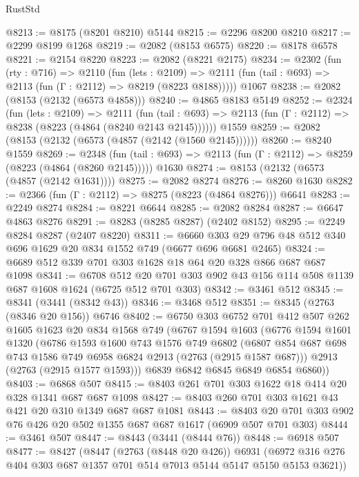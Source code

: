 \begin{lexlean}{RustStd}
\begin{coremodule}
@8213 := @8175 (@8201 @8210) @5144
@8215 := @2296 @8200 @8210
@8217 := @2299 @8199 @1268
@8219 := @2082 (@8153 @6575)
@8220 := @8178 @6578
@8221 := @2154 @8220
@8223 := @2082 (@8221 @2175)
@8234 := @2302
    (fun (rty : @716) =>
    @2110
      (fun (lets : @2109) =>
      @2111 (fun (tail : @693) => @2113 (fun (Γ : @2112) => @8219 (@8223 @8188)))))
    @1067
@8238 := @2082 (@8153 (@2132 (@6573 @4858)))
@8240 := @4865 @8183 @5149
@8252 := @2324
    (fun (lets : @2109) =>
    @2111
      (fun (tail : @693) => @2113 (fun (Γ : @2112) => @8238 (@8223 (@4864 (@8240 @2143 @2145))))))
    @1559
@8259 := @2082 (@8153 (@2132 (@6573 (@4857 (@2142 (@1560 @2145))))))
@8260 := @8240 @1559
@8269 := @2348
    (fun (tail : @693) => @2113 (fun (Γ : @2112) => @8259 (@8223 (@4864 (@8260 @2145)))))
    @1630
@8274 := @8153 (@2132 (@6573 (@4857 (@2142 @1631))))
@8275 := @2082 @8274
@8276 := @8260 @1630
@8282 := @2366 (fun (Γ : @2112) => @8275 (@8223 (@4864 @8276))) @6641
@8283 := @2249 @8274
@8284 := @8221 @6644
@8285 := @2082 @8284
@8287 := @6647 @4863 @8276
@8291 := @8283 (@8285 @8287) (@2402 @8152)
@8295 := @2249 @8284 @8287 (@2407 @8220)
@8311 := @6660 @303 @29 @796 @48 @512 @340 @696 @1629 @20 @834 @1552 @749 (@6677 @696 @6681 @2465)
@8324 := @6689 @512 @339 @701 @303 @1628 @18 @64 @20 @328 @866 @687 @687 @1098
@8341 := @6708
    @512
    @20
    @701
    @303
    @902
    @43
    @156
    @114
    @508
    @1139
    @687
    @1608
    @1624
    (@6725 @512 @701 @303)
@8342 := @3461 @512
@8345 := @8341 (@3441 (@8342 @43))
@8346 := @3468 @512
@8351 := @8345 (@2763 (@8346 @20 @156)) @6746
@8402 := @6750
    @303
    @6752
    @701
    @412
    @507
    @262
    @1605
    @1623
    @20
    @834
    @1568
    @749
    (@6767
      @1594
      @1603
      (@6776
        @1594
        @1601
        @1320
        (@6786
          @1593
          @1600
          @743
          @1576
          @749
          @6802
          (@6807 @854 @687 @698 @743 @1586 @749 @6958 @6824 @2913 (@2763 (@2915 @1587 @687)))
          @2913
          (@2763 (@2915 @1577 @1593)))
        @6839
        @6842
        @6845
        @6849
        @6854
        @6860))
@8403 := @6868 @507
@8415 := @8403 @261 @701 @303 @1622 @18 @414 @20 @328 @1341 @687 @687 @1098
@8427 := @8403 @260 @701 @303 @1621 @43 @421 @20 @310 @1349 @687 @687 @1081
@8443 := @8403 @20 @701 @303 @902 @76 @426 @20 @502 @1355 @687 @687 @1617 (@6909 @507 @701 @303)
@8444 := @3461 @507
@8447 := @8443 (@3441 (@8444 @76))
@8448 := @6918 @507
@8477 := @8427
    (@8447
      (@2763 (@8448 @20 @426))
      @6931
      (@6972 @316 @276 @404 @303 @687 @1357 @701 @514 @7013 @5144 @5147 @5150 @5153 @3621))

\end{coremodule}
\end{lexlean}
